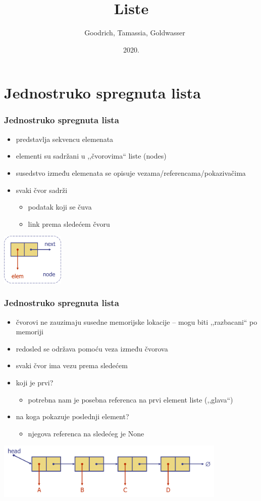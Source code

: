 \documentclass[compress,aspectratio=169]{beamer}
\title{Liste}
\author{\textcopyright \ \ Goodrich, Tamassia, Goldwasser}
\institute{Katedra za informatiku, Fakultet tehničkih nauka, Univerzitet u
Novom Sadu}
\date{2020.}
\begin{document}
\frame{\titlepage}

\section[1-Lista]{Jednostruko spregnuta lista}
\begin{frame}[fragile]
  \frametitle{Jednostruko spregnuta lista}
  \begin{itemize}
    \item predstavlja sekvencu elemenata
    \item elementi su sadržani u ,,čvorovima`` liste (nodes)
    \item susedstvo između elemenata se opisuje vezama/referencama/pokazivačima
    \item svaki čvor sadrži
    \begin{itemize}
      \item podatak koji se čuva
      \item link prema sledećem čvoru
    \end{itemize}
  \end{itemize}
  \begin{center}
    \includegraphics[width=3cm]{asp-07-pic01.png}
  \end{center}
\end{frame}

\begin{frame}[fragile]
  \frametitle{Jednostruko spregnuta lista}
  \begin{itemize}
    \item čvorovi ne zauzimaju susedne memorijske lokacije -- mogu biti ,,razbacani`` po memoriji
    \item redosled se održava pomoću veza između čvorova
    \item svaki čvor ima vezu prema sledećem
    \item koji je prvi?
    \begin{itemize}
      \item potrebna nam je posebna referenca na prvi element liste (,,glava``)
    \end{itemize}
    \item na koga pokazuje poslednji element?
    \begin{itemize}
      \item njegova referenca na sledećeg je None
    \end{itemize}
  \end{itemize}
  \begin{center}
    \includegraphics[width=11cm]{asp-07-pic02.png}
  \end{center}
\end{frame}
\end{document}
